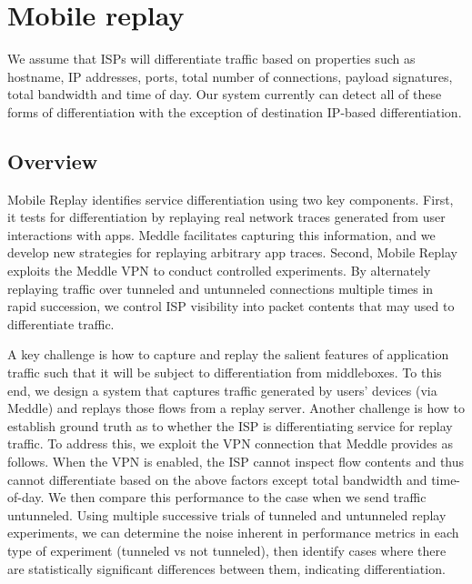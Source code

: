 \documentclass[letterpaper]{sig-alternate-2013}
\begin{document}
\section{Mobile replay}
\label{sec:method}

We assume that ISPs will differentiate traffic based on properties such as hostname, IP addresses, ports, total number of connections, payload signatures, total bandwidth and time of day. Our system currently can detect all of these forms of differentiation with the exception of destination IP-based differentiation.

\subsection{Overview} Mobile Replay identifies service differentiation using two key components. First, it tests for differentiation by replaying real network traces generated from user interactions with apps. Meddle \cite{meddle} facilitates capturing this information, and we develop new strategies for replaying arbitrary app traces. Second, Mobile Replay exploits the Meddle VPN to conduct controlled experiments. By alternately replaying traffic over tunneled and untunneled connections multiple times in rapid succession, we control ISP visibility into packet contents that may used to differentiate traffic.

A key challenge is how to capture and replay the salient features of application traffic such that it will be subject to differentiation from middleboxes. To this end, we design a system that captures traffic generated by users' devices (via Meddle) and replays those flows from a replay server. Another challenge is how to establish ground truth as to whether the ISP is differentiating service for replay traffic. To address this, we exploit the VPN connection that Meddle provides as follows. When the VPN is enabled, the ISP cannot inspect flow contents and thus cannot differentiate based on the above factors except total bandwidth and time-of-day. We then compare this performance to the case when we send traffic untunneled. Using multiple successive trials of tunneled and untunneled replay experiments, we can determine the noise inherent in performance metrics in each type of experiment (tunneled vs not tunneled), then identify cases where there are statistically significant differences between them, indicating differentiation.
\end{document}

